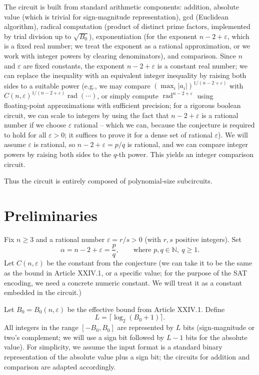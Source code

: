 \documentclass[11pt,a4paper]{article}
\begin{document}
The circuit is built from standard arithmetic components: addition, absolute value (which is trivial for sign‑magnitude representation), gcd (Euclidean algorithm), radical computation (product of distinct prime factors, implemented by trial division up to $\sqrt{B_0}$), exponentiation (for the exponent $n-2+\varepsilon$, which is a fixed real number; we treat the exponent as a rational approximation, or we work with integer powers by clearing denominators), and comparison. Since $n$ and $\varepsilon$ are fixed constants, the exponent $n-2+\varepsilon$ is a constant real number; we can replace the inequality with an equivalent integer inequality by raising both sides to a suitable power (e.g., we may compare $(\max_i |a_i|)^{1/(n-2+\varepsilon)}$ with $C(n,\varepsilon)^{1/(n-2+\varepsilon)}\operatorname{rad}(\cdots)$, or simply compute $\operatorname{rad}^{n-2+\varepsilon}$ using floating‑point approximations with sufficient precision; for a rigorous boolean circuit, we can scale to integers by using the fact that $n-2+\varepsilon$ is a rational number if we choose $\varepsilon$ rational – which we can, because the conjecture is required to hold for all $\varepsilon>0$; it suffices to prove it for a dense set of rational $\varepsilon$). We will assume $\varepsilon$ is rational, so $n-2+\varepsilon = p/q$ is rational, and we can compare integer powers by raising both sides to the $q$-th power. This yields an integer comparison circuit.

Thus the circuit is entirely composed of polynomial‑size subcircuits.

\section{Preliminaries}
Fix $n\ge 3$ and a rational number $\varepsilon = r/s > 0$ (with $r,s$ positive integers). Set
\[
\alpha = n-2+\varepsilon = \frac{p}{q},\qquad \text{where } p,q\in\mathbb{N},\ q\ge 1.
\]
Let $C(n,\varepsilon)$ be the constant from the conjecture (we can take it to be the same as the bound in Article XXIV.1, or a specific value; for the purpose of the SAT encoding, we need a concrete numeric constant. We will treat it as a constant embedded in the circuit.)

Let $B_0 = B_0(n,\varepsilon)$ be the effective bound from Article XXIV.1. Define
\[
L = \lceil \log_2(B_0+1)\rceil.
\]
All integers in the range $[-B_0, B_0]$ are represented by $L$ bits (sign‑magnitude or two's complement; we will use a sign bit followed by $L-1$ bits for the absolute value). For simplicity, we assume the input format is a standard binary representation of the absolute value plus a sign bit; the circuits for addition and comparison are adapted accordingly.
\end{document}

